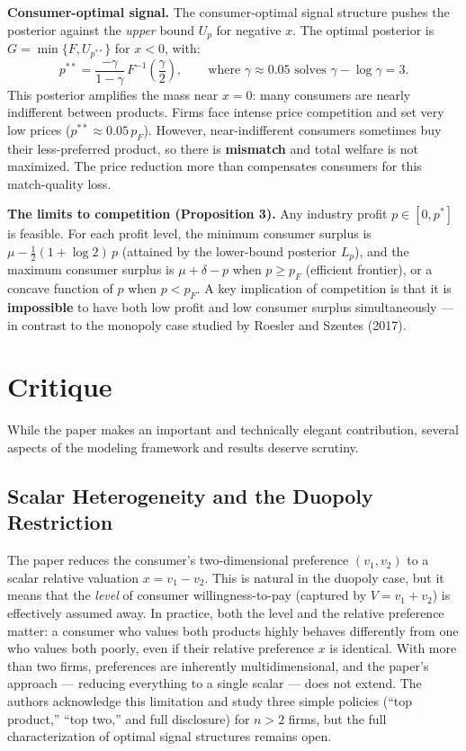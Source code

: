 \documentclass[12pt, a4paper]{article}
\begin{document}
\textbf{Consumer-optimal signal.} The consumer-optimal signal structure pushes the posterior against the \emph{upper} bound $U_p$ for negative $x$. The optimal posterior is $G = \min\{F, U_{p^{**}}\}$ for $x < 0$, with:
\begin{equation}
    p^{**} = \frac{-\gamma}{1-\gamma}\, F^{-1}\!\left(\frac{\gamma}{2}\right), \qquad \text{where } \gamma \approx 0.05 \text{ solves } \gamma - \log \gamma = 3.
\end{equation}
This posterior amplifies the mass near $x = 0$: many consumers are nearly indifferent between products. Firms face intense price competition and set very low prices ($p^{**} \approx 0.05\, p_F$). However, near-indifferent consumers sometimes buy their less-preferred product, so there is \textbf{mismatch} and total welfare is not maximized. The price reduction more than compensates consumers for this match-quality loss.

\textbf{The limits to competition (Proposition 3).} Any industry profit $p \in [0, p^*]$ is feasible. For each profit level, the minimum consumer surplus is $\mu - \frac{1}{2}(1 + \log 2)\,p$ (attained by the lower-bound posterior $L_p$), and the maximum consumer surplus is $\mu + \delta - p$ when $p \geq p_F$ (efficient frontier), or a concave function of $p$ when $p < p_F$. A key implication of competition is that it is \textbf{impossible} to have both low profit and low consumer surplus simultaneously --- in contrast to the monopoly case studied by Roesler and Szentes (2017).


\section{Critique}

While the paper makes an important and technically elegant contribution, several aspects of the modeling framework and results deserve scrutiny.

\subsection{Scalar Heterogeneity and the Duopoly Restriction}

The paper reduces the consumer's two-dimensional preference $(v_1, v_2)$ to a scalar relative valuation $x = v_1 - v_2$. This is natural in the duopoly case, but it means that the \emph{level} of consumer willingness-to-pay (captured by $V = v_1 + v_2$) is effectively assumed away. In practice, both the level and the relative preference matter: a consumer who values both products highly behaves differently from one who values both poorly, even if their relative preference $x$ is identical. With more than two firms, preferences are inherently multidimensional, and the paper's approach --- reducing everything to a single scalar --- does not extend. The authors acknowledge this limitation and study three simple policies (``top product,'' ``top two,'' and full disclosure) for $n > 2$ firms, but the full characterization of optimal signal structures remains open.
\end{document}
